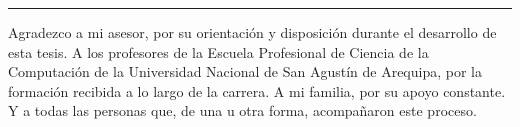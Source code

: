\begin{acknowledgements}
\hrule \bigskip \vspace*{1cm}

Agradezco a mi asesor, por su orientación y disposición durante el desarrollo de esta tesis. A los profesores de la Escuela Profesional de Ciencia de la Computación de la Universidad Nacional de San Agustín de Arequipa, por la formación recibida a lo largo de la carrera. A mi familia, por su apoyo constante. Y a todas las personas que, de una u otra forma, acompañaron este proceso.

\end{acknowledgements}

